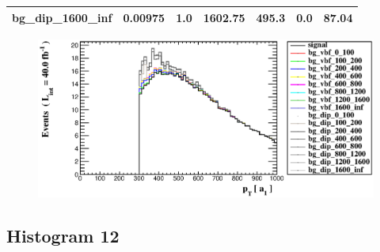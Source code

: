 \documentclass[a4paper, 10pt]{article}
\begin{document}
\begin{table}[H]
\begin{center}
\begin{tabular}{|m{23.0mm}|m{23.0mm}|m{18.0mm}|m{19.0mm}|m{19.0mm}|m{19.0mm}|m{19.0mm}|}
      \hline
      {\cellcolor{white}         bg\_dip\_1600\_inf}& {\cellcolor{white}         0.00975}& {\cellcolor{white}         1.0}& {\cellcolor{white}         1602.75}& {\cellcolor{white}         495.3}& {\cellcolor{red}         0.0}& {\cellcolor{red}         87.04}\\
\hline
    \end{tabular}
  \end{center}
\end{table}

\begin{figure}[H]
  \begin{center}
    \includegraphics[scale=0.45]{selection_10.eps}\\
\caption{   }
  \end{center}
\end{figure}
      \newpage
\subsection{ Histogram 12}
\end{document}
